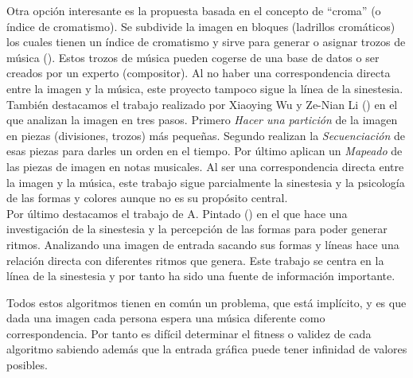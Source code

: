 Otra opción interesante es la propuesta basada en el concepto de ``croma'' (o índice de cromatismo). Se subdivide la imagen en bloques (ladrillos cromáticos) los cuales tienen un índice de cromatismo y sirve para generar o asignar trozos de música (\cite{bricksConvertsMusic}). Estos trozos de música pueden cogerse de una base de datos o ser creados por un experto (compositor). Al no haber una correspondencia directa entre la imagen y la música, este proyecto tampoco sigue la línea de la sinestesia.\\

También destacamos el trabajo realizado por Xiaoying Wu y Ze-Nian Li (\cite{ImageBaseComposition}) en el que analizan la imagen en tres pasos. Primero \emph{Hacer una partición} de la imagen en piezas (divisiones, trozos) más pequeñas. Segundo realizan la \emph{Secuenciación} de esas piezas para darles un orden en el tiempo. Por último aplican un \emph{Mapeado} de las piezas de imagen en notas musicales. Al ser una correspondencia directa entre la imagen y la música, este trabajo sigue parcialmente la sinestesia y la psicología de las formas y colores aunque no es su propósito central.\\

Por último destacamos el trabajo de A. Pintado (\cite{portutesis}) en el que hace una investigación de la sinestesia y la percepción de las formas para poder generar ritmos. Analizando una imagen de entrada sacando sus formas y líneas hace una relación directa con diferentes ritmos que genera. Este trabajo se centra en la línea de la sinestesia y por tanto ha sido una fuente de información importante.

Todos estos algoritmos tienen en común un problema, que está implícito, y es que dada una imagen cada persona espera una música diferente como correspondencia. Por tanto es difícil determinar el fitness o validez de cada algoritmo sabiendo además que la entrada gráfica puede tener infinidad de valores posibles.

